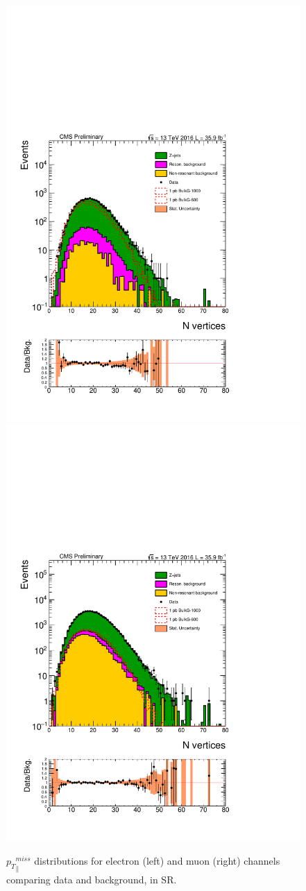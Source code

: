 \begin{figure}[htbp!]
\centering
\includegraphics[width=0.46\linewidth,page=22]{figures/ReMiniSummer16_DT_PhReMiniMCRcFixXsec_GMCPhPtWt_SRdPhiGT0p5_puWeightsummer16_muoneg_gjet_metfilter_unblind_el_log_1pb.pdf}
\includegraphics[width=0.46\linewidth,page=22]{figures/ReMiniSummer16_DT_PhReMiniMCRcFixXsec_GMCPhPtWt_SRdPhiGT0p5_puWeightsummer16_muoneg_gjet_metfilter_unblind_mu_log_1pb.pdf}
\caption{${p_{T}}^{miss}_\parallel$ distributions for electron (left) and muon (right)
channels comparing data and background, in SR.}
\label{fit:SR_gjet_metpara}
\end{figure}


